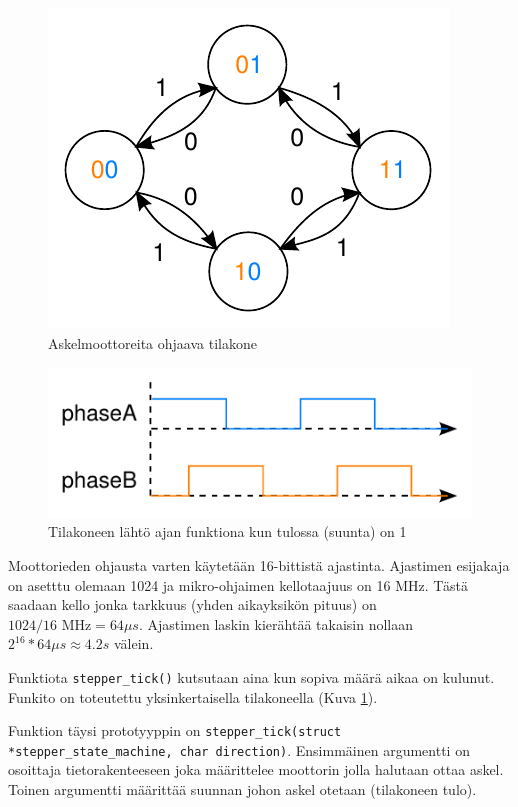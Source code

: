 \documentclass[]{article} %
\numberwithin{equation}{section}
\numberwithin{figure}{section}
\numberwithin{table}{section}
\begin{document}
\begin{figure}
    \centering
    \caption{Askelmoottoreita ohjaava tilakone}
    \label{fig:stepper_fsm}
    \includegraphics[scale=0.8]{./stepper_fsm.pdf}
\end{figure}
\begin{figure}
    \centering
    \caption{Tilakoneen lähtö ajan funktiona kun tulossa (suunta) on 1}
    \includegraphics[scale=0.8]{./stepper_timing.pdf}
\end{figure}



Moottorieden ohjausta varten käytetään 16-bittistä ajastinta. Ajastimen esijakaja on asetttu olemaan 1024 ja mikro-ohjaimen kellotaajuus on 16 MHz. Tästä saadaan kello jonka tarkkuus (yhden aikayksikön pituus) on $1024/16 \text{ MHz} = 64 \mu s $. Ajastimen laskin kierähtää takaisin nollaan $2^{16} * 64\mu s \approx 4.2 s$ välein. 

Funktiota \verb+stepper_tick()+ kutsutaan aina kun sopiva määrä aikaa on kulunut. Funkito on toteutettu yksinkertaisella tilakoneella (Kuva \ref{fig:stepper_fsm}).

Funktion täysi prototyyppin on \verb+stepper_tick(struct *stepper_state_machine, char direction)+. Ensimmäinen argumentti on osoittaja tietorakenteeseen joka määrittelee moottorin jolla halutaan ottaa askel. Toinen argumentti määrittää suunnan johon askel otetaan (tilakoneen tulo).
\end{document}
